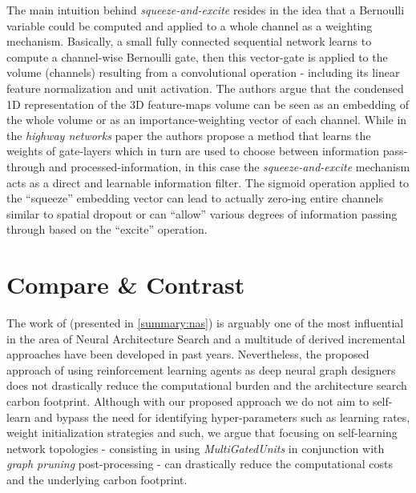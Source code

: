 \documentclass[conference]{IEEEtran}
\begin{document}
The main intuition behind \textit{squeeze-and-excite} resides in the idea that a Bernoulli variable could be computed and applied to a whole channel as a weighting mechanism. Basically, a small fully connected sequential network learns to compute a channel-wise Bernoulli gate, then this vector-gate  is applied to the volume (channels) resulting from a convolutional operation - including its linear feature normalization and unit activation. The authors argue that the condensed 1D representation of the 3D feature-maps volume can be seen as an embedding of the whole volume or as an importance-weighting vector of each channel. While in the \textit{highway networks} paper the authors propose a method that learns the weights of gate-layers which in turn are used to choose between information pass-through and processed-information, in this case the \textit{squeeze-and-excite} mechanism acts as a direct and learnable information filter. The sigmoid operation applied to the “squeeze” embedding vector can lead to actually zero-ing entire channels similar to spatial dropout or can “allow” various degrees of information passing through based on the “excite” operation.



\section{Compare \& Contrast}

The work of \cite{Zoph2017} (presented in \ref{summary:nas}) is arguably one of the most influential in the area of Neural Architecture Search and a multitude of derived incremental approaches have been developed in past years. Nevertheless, the proposed approach of using reinforcement learning agents as deep neural graph designers does not drastically reduce the computational burden and the architecture search carbon footprint. Although with our proposed approach we do not aim to self-learn and bypass the need for identifying hyper-parameters such as learning rates, weight initialization strategies and such, we argue that focusing on self-learning network topologies - consisting in using \textit{MultiGatedUnits} in conjunction with \textit{graph pruning} post-processing - can drastically reduce the computational costs and the underlying carbon footprint.
\end{document}
